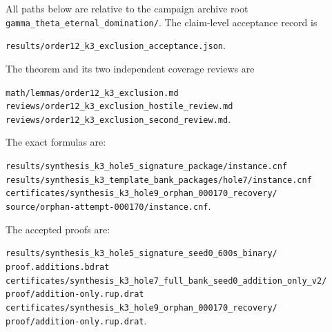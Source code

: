 \documentclass[11pt]{article}
\theoremstyle{definition}
\theoremstyle{remark}
\begin{document}
All paths below are relative to the campaign archive root
\texttt{gamma\_theta\_eternal\_domination/}.  The claim-level acceptance
record is
\begin{center}
\texttt{results/order12\_k3\_exclusion\_acceptance.json}.
\end{center}
The theorem and its two independent coverage reviews are
\begin{center}
\begin{minipage}{0.94\linewidth}
\texttt{math/lemmas/order12\_k3\_exclusion.md}\\
\texttt{reviews/order12\_k3\_exclusion\_hostile\_review.md}\\
\texttt{reviews/order12\_k3\_exclusion\_second\_review.md}.
\end{minipage}
\end{center}

The exact formulas are:
\begin{center}
\begin{minipage}{0.94\linewidth}
\texttt{results/synthesis\_k3\_hole5\_signature\_package/instance.cnf}\\
\texttt{results/synthesis\_k3\_template\_bank\_packages/hole7/instance.cnf}\\
\texttt{certificates/synthesis\_k3\_hole9\_orphan\_000170\_recovery/}\\
\hspace*{1em}\texttt{source/orphan-attempt-000170/instance.cnf}.
\end{minipage}
\end{center}
The accepted proofs are:
\begin{center}
\begin{minipage}{0.94\linewidth}
\texttt{results/synthesis\_k3\_hole5\_signature\_seed0\_600s\_binary/}\\
\hspace*{1em}\texttt{proof.additions.bdrat}\\
\texttt{certificates/synthesis\_k3\_hole7\_full\_bank\_seed0\_addition\_only\_v2/}\\
\hspace*{1em}\texttt{proof/addition-only.rup.drat}\\
\texttt{certificates/synthesis\_k3\_hole9\_orphan\_000170\_recovery/}\\
\hspace*{1em}\texttt{proof/addition-only.rup.drat}.
\end{minipage}
\end{center}
\end{document}
